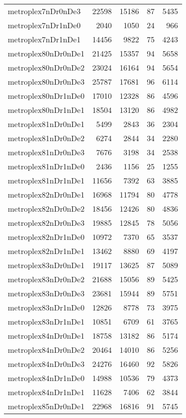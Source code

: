 \begin{longtable}{lrrrr}
metroplex7nDr0nDe3 & 22598 & 15186 & 87 & 5435 \\
metroplex7nDr1nDe0 & 2040 & 1050 & 24 & 966 \\
metroplex7nDr1nDe1 & 14456 & 9822 & 75 & 4243 \\
metroplex80nDr0nDe1 & 21425 & 15357 & 94 & 5658 \\
metroplex80nDr0nDe2 & 23024 & 16164 & 94 & 5654 \\
metroplex80nDr0nDe3 & 25787 & 17681 & 96 & 6114 \\
metroplex80nDr1nDe0 & 17010 & 12328 & 86 & 4596 \\
metroplex80nDr1nDe1 & 18504 & 13120 & 86 & 4982 \\
metroplex81nDr0nDe1 & 5499 & 2843 & 36 & 2304 \\
metroplex81nDr0nDe2 & 6274 & 2844 & 34 & 2280 \\
metroplex81nDr0nDe3 & 7676 & 3198 & 34 & 2538 \\
metroplex81nDr1nDe0 & 2436 & 1156 & 25 & 1255 \\
metroplex81nDr1nDe1 & 11656 & 7392 & 63 & 3885 \\
metroplex82nDr0nDe1 & 16968 & 11794 & 80 & 4778 \\
metroplex82nDr0nDe2 & 18456 & 12426 & 80 & 4836 \\
metroplex82nDr0nDe3 & 19885 & 12845 & 78 & 5056 \\
metroplex82nDr1nDe0 & 10972 & 7370 & 65 & 3537 \\
metroplex82nDr1nDe1 & 13462 & 8880 & 69 & 4197 \\
metroplex83nDr0nDe1 & 19117 & 13625 & 87 & 5089 \\
metroplex83nDr0nDe2 & 21688 & 15056 & 89 & 5425 \\
metroplex83nDr0nDe3 & 23681 & 15944 & 89 & 5751 \\
metroplex83nDr1nDe0 & 12826 & 8778 & 73 & 3975 \\
metroplex83nDr1nDe1 & 10851 & 6709 & 61 & 3765 \\
metroplex84nDr0nDe1 & 18758 & 13182 & 86 & 5174 \\
metroplex84nDr0nDe2 & 20464 & 14010 & 86 & 5256 \\
metroplex84nDr0nDe3 & 24276 & 16460 & 92 & 5826 \\
metroplex84nDr1nDe0 & 14988 & 10536 & 79 & 4373 \\
metroplex84nDr1nDe1 & 11628 & 7406 & 62 & 3844 \\
metroplex85nDr0nDe1 & 22968 & 16816 & 91 & 5745 \\

\end{longtable}
